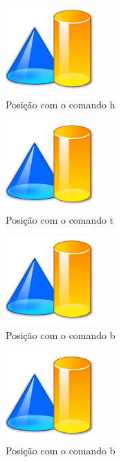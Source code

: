 \documentclass{book}
\newcommand\blankpage{%
    \null
    \thispagestyle{empty}%
    \addtocounter{page}{-1}%
    \newpage}
\begin{document}
\pagestyle{empty}
	\lipsum[1]
	\begin{figure}[h]
	  \centering
	  \includegraphics[scale=2]{formas.png}
	  \caption{Posição com o comando h}
	 \end{figure}
	\lipsum[2-6]


	\newpage
	\lipsum[1]
	\begin{figure}[t]
	  \centering
	  \includegraphics[scale=2]{formas.png}
	  \caption{Posição com o comando t}
	 \end{figure}
	\lipsum[2-5]


	\newpage
	\lipsum[1]
	\begin{figure}[b!]
	  \centering
	  \includegraphics[scale=2]{formas.png}
	  \caption{Posição com o comando b}
	 \end{figure}
	\lipsum[2-6]

	\blankpage
	
	\lipsum[1]
	\begin{figure}[h]
	  \centering
	  \includegraphics[scale=2]{formas.png}
	  \caption{Posição com o comando b}
	\end{figure}
	\lipsum[2]
\end{document}
